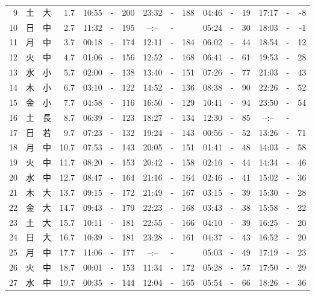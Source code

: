 \documentclass[12pt.a4j]{jsarticle}
\begin{document}
\begin{center}
\begin{table}[ht]
\begin{tabular}{|rc|cr|ccrccr|ccrccr|}
 9 & 土 & 大 &  1.7 &  10:55 &-& 200  &  23:32 &-& 188  &   04:46 &-&  19  &   17:17 &-&  -8  \\
10 & 日 & 中 &  2.7 &  11:32 &-& 195  &  --:-- &-&     &   05:24 &-&  30  &   18:03 &-&  -1  \\
11 & 月 & 中 &  3.7 &  00:18 &-& 174  &  12:11 &-& 184  &   06:02 &-&  44  &   18:54 &-&  12  \\
12 & 火 & 中 &  4.7 &  01:06 &-& 156  &  12:52 &-& 168  &   06:41 &-&  61  &   19:53 &-&  28  \\
13 & 水 & 小 &  5.7 &  02:00 &-& 138  &  13:40 &-& 151  &   07:26 &-&  77  &   21:03 &-&  43  \\
14 & 木 & 小 &  6.7 &  03:10 &-& 122  &  14:52 &-& 136  &   08:38 &-&  90  &   22:26 &-&  52  \\
15 & 金 & 小 &  7.7 &  04:58 &-& 116  &  16:50 &-& 129  &   10:41 &-&  94  &   23:50 &-&  54  \\
16 & 土 & 長 &  8.7 &  06:39 &-& 123  &  18:27 &-& 134  &   12:30 &-&  85  &   --:-- &-&     \\
17 & 日 & 若 &  9.7 &  07:23 &-& 132  &  19:24 &-& 143  &   00:56 &-&  52  &   13:26 &-&  71  \\
18 & 月 & 中 & 10.7 &  07:53 &-& 143  &  20:05 &-& 151  &   01:41 &-&  48  &   14:03 &-&  58  \\
19 & 火 & 中 & 11.7 &  08:20 &-& 153  &  20:42 &-& 158  &   02:16 &-&  44  &   14:34 &-&  46  \\
20 & 水 & 中 & 12.7 &  08:47 &-& 164  &  21:16 &-& 164  &   02:46 &-&  41  &   15:02 &-&  36  \\
21 & 木 & 大 & 13.7 &  09:15 &-& 172  &  21:49 &-& 167  &   03:15 &-&  39  &   15:30 &-&  28  \\
22 & 金 & 大 & 14.7 &  09:43 &-& 179  &  22:23 &-& 168  &   03:43 &-&  38  &   15:58 &-&  22  \\
23 & 土 & 大 & 15.7 &  10:11 &-& 181  &  22:55 &-& 166  &   04:10 &-&  39  &   16:25 &-&  20  \\
24 & 日 & 大 & 16.7 &  10:39 &-& 181  &  23:28 &-& 161  &   04:37 &-&  43  &   16:52 &-&  20  \\
25 & 月 & 中 & 17.7 &  11:06 &-& 177  &  --:-- &-&     &   05:03 &-&  49  &   17:19 &-&  23  \\
26 & 火 & 中 & 18.7 &  00:01 &-& 153  &  11:34 &-& 172  &   05:28 &-&  57  &   17:50 &-&  29  \\
27 & 水 & 中 & 19.7 &  00:35 &-& 144  &  12:04 &-& 165  &   05:54 &-&  66  &   18:26 &-&  36  \\

\end{tabular}
\end{table}
\end{center}
\end{document}
